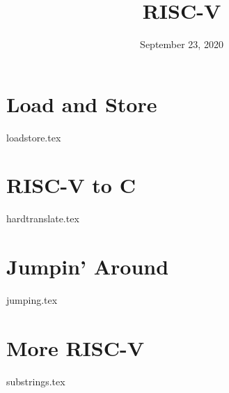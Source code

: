 \documentclass[11pt]{exam}
\title{RISC-V}
\date{September 23, 2020}
\begin{document}
\maketitle

\section{Load and Store}
\begin{questions}
{loadstore.tex}
\end{questions}
\newpage

\section{RISC-V to C}
\begin{questions}
{hardtranslate.tex}
\end{questions}

\section{Jumpin' Around}
\begin{questions}
{jumping.tex}
\end{questions}

\section{More RISC-V}
\begin{questions}
{substrings.tex}
\end{questions}
\newpage
\end{document}
